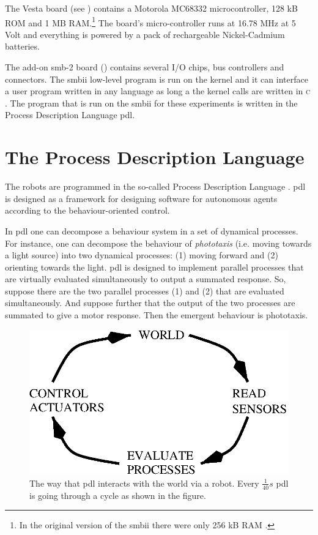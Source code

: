 The Vesta board (see ) contains a Motorola MC68332 microcontroller, 128 kB ROM and 1 MB RAM.\footnote{In the original version of the {\sc smbii} there were only 256 kB RAM \citep{vereertbrugghen:1996}.} The board's micro-controller runs at 16.78 MHz at 5 Volt and everything is powered by a pack of rechargeable Nickel-Cadmium batteries.

The add-on {\sc smb}-2 board () contains several I/O chips, bus controllers and connectors. The {\sc smbii} low-level program is run on the kernel and it can interface a user program written in any language as long a the kernel calls are written in \textsc{c}  \citep{vereertbrugghen:1996}. The program that is run on the {\sc smbii} for these experiments is written in the Process Description Language {\sc pdl}. 

\section{The Process Description Language}\label{s:robots:PDL}\label{s:robots:pdl}

The robots are programmed in the so-called Process Description Language \citep{steels:1992,steels:1994a,steels:1994b}. {\sc pdl} is designed as a framework for designing software for autonomous agents according to the behaviour-oriented control. 

In {\sc pdl} one can decompose a behaviour system in a set of dynamical processes. For instance, one can decompose the behaviour of {\em phototaxis} (i.e. moving towards a light source) into two dynamical processes: (1) moving forward and (2) orienting towards the light. {\sc pdl} is designed to implement parallel processes that are virtually evaluated simultaneously to output a summated response. So, suppose there are the two parallel processes (1) and (2) that are evaluated  simultaneously. And suppose further that the output of the two processes are summated to give a motor response. Then the emergent behaviour is phototaxis. 

\begin{figure}
\centerline{\includegraphics[width=12cm]{robots//pdlcycle.eps}}
\caption{The way that {\sc pdl} interacts with the world via a robot. Every $\frac{1}{40} s$ {\sc pdl} is going through a cycle as shown in the figure.}
\label{f:pdlcycle}
\end{figure}

